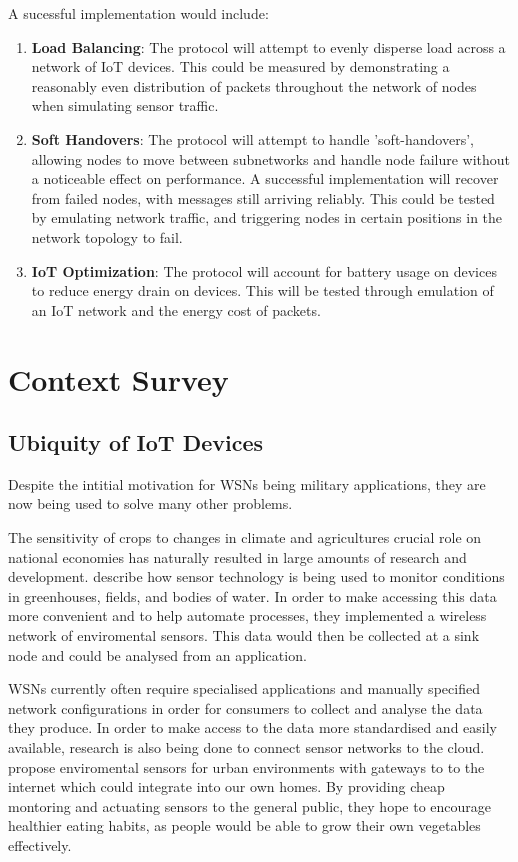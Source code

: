 \documentclass[12pt]{article}
\begin{document}
\vspace{\baselineskip}
\noindent A sucessful implementation would include:

\begin{enumerate}
	\item \textbf{Load Balancing}: The protocol will attempt to evenly disperse load across a network of IoT
devices. This could be measured by demonstrating a reasonably even distribution of packets throughout the network of nodes when simulating sensor traffic. 
	\item \textbf{Soft Handovers}: The protocol will attempt to handle ’soft-handovers’, allowing nodes to
move between subnetworks and handle node failure without a noticeable effect on performance. A successful implementation will recover from failed nodes, with messages still arriving reliably. This could be tested by emulating network traffic, and triggering nodes in certain positions in the network topology to fail.

\item \textbf{IoT Optimization}: The protocol will account for battery usage on devices to reduce energy drain
on devices. This will be tested through emulation of an IoT network and the energy cost of packets.
\end{enumerate}

\pagebreak
\section{Context Survey}

\subsection{Ubiquity of IoT Devices}

Despite the intitial motivation for WSNs being military applications, they are now being used to solve many other problems.

The sensitivity of crops to changes in climate and agricultures crucial role on national economies has naturally resulted in large amounts of research and development. \cite{agrisensor} describe how sensor technology is being used to monitor conditions in greenhouses, fields, and bodies of water. In order to make accessing this data more convenient and to help automate processes, they implemented a wireless network of enviromental sensors. This data would then be collected at a sink node and could be analysed from an application. 

WSNs currently often require specialised applications and manually specified network configurations in order for consumers to collect and analyse the data they produce. In order to make access to the data more standardised and easily available, research is also being done to connect sensor networks to the cloud. \cite{indoor} propose enviromental sensors for urban environments with gateways to to the internet which could integrate into our own homes. By providing cheap montoring and actuating sensors to the general public, they hope to encourage healthier eating habits, as people would be able to grow their own vegetables effectively. 
\end{document}
